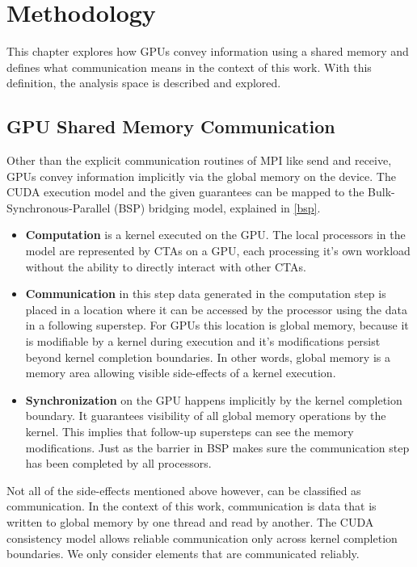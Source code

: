 \chapter{Methodology}
This chapter explores how GPUs convey information using a shared memory and defines what communication means in the context of this work. With this definition, the analysis space is described and explored.
\section{GPU Shared Memory Communication}
Other than the explicit communication routines of MPI like send and receive, GPUs convey information implicitly via the global memory on the device. 
The CUDA execution model and the given guarantees can be mapped to the Bulk-Synchronous-Parallel (BSP) bridging model, explained in \ref{bsp}.
\begin{itemize}
	\item \textbf{Computation} is a kernel executed on the GPU. The local processors in the model are represented by CTAs on a GPU, each processing it's own workload without the ability to directly
	interact with other CTAs.
	\item \textbf{Communication} in this step data generated in the computation step is placed in a location where it can be accessed by the processor using the data in a following superstep. For GPUs this location is 
	global memory, because it is modifiable by a kernel during execution and it's modifications persist beyond kernel completion boundaries. In other words, global memory is a memory area allowing visible side-effects
	of a kernel execution.
	\item \textbf{Synchronization} on the GPU happens implicitly by the kernel completion boundary. It guarantees visibility of all global memory operations by the kernel. This implies that follow-up supersteps can see the memory modifications. Just as the barrier in BSP makes sure the communication step
	has been completed by all processors.
	
\end{itemize} 
 Not all of the side-effects mentioned above however, can be classified as communication. In the context of this work, communication is data that is written to global memory by one thread and read by another. The CUDA consistency model allows reliable communication only across kernel completion boundaries. We only consider elements that are communicated reliably.

